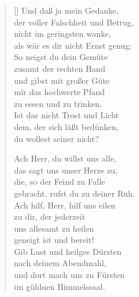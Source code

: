 \begin{multicols}{2}
\begin{verse}[\versewidth]
 Und daß ja mein Gedanke,\\
der voller Falschheit und Betrug,\\
nicht im geringsten wanke,\\
als wär es dir nicht Ernst genug:\\
So neigst du dein Gemüte\\
zusamt der rechten Hand\\
und gibst mit großer Güte\\
mir das hochwerte Pfand\\
zu essen und zu trinken.\\
Ist das nicht Trost und Licht\\
dem, der sich läßt bedünken,\\
du wollest seiner nicht?

 Ach Herr, du willst uns alle,\\
das sagt uns unser Herze zu,\\
die, so der Feind zu Falle\\
gebracht, rufst du zu deiner Ruh.\\
Ach hilf, Herr, hilf uns eilen\\
zu dir, der jederzeit\\
uns allesamt zu heilen\\
geneigt ist und bereit!\\
Gib Lust und heilges Dürsten\\
nach deinem Abendmahl,\\
und dort mach uns zu Fürsten\\
im güldnen Himmelssaal.

\end{verse}
\end{multicols}
